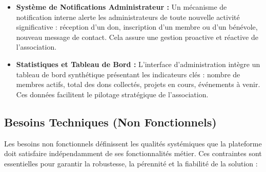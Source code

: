 \documentclass[12pt,a4paper,twoside,openright]{report}
\begin{document}
\begin{itemize}[label=\textcolor{primaryBlue}{$\bullet$}, leftmargin=1.5cm, itemsep=0.35cm]
    \item \textbf{Système de Notifications Administrateur :}
    Un mécanisme de notification interne alerte les administrateurs de toute nouvelle activité significative : réception d'un don, inscription d'un membre ou d'un bénévole, nouveau message de contact. Cela assure une gestion proactive et réactive de l'association.

    \item \textbf{Statistiques et Tableau de Bord :}
    L'interface d'administration intègre un tableau de bord synthétique présentant les indicateurs clés : nombre de membres actifs, total des dons collectés, projets en cours, événements à venir. Ces données facilitent le pilotage stratégique de l'association.

\end{itemize}

\vspace{0.6cm}

\subsection{Besoins Techniques (Non Fonctionnels)}

Les besoins non fonctionnels définissent les qualités systémiques que la plateforme doit satisfaire indépendamment de ses fonctionnalités métier. Ces contraintes sont essentielles pour garantir la robustesse, la pérennité et la fiabilité de la solution :
\end{document}
